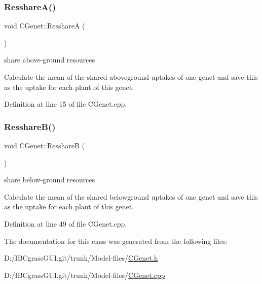 \subsubsection{\texorpdfstring{ResshareA()}{ResshareA()}}
{\footnotesize\ttfamily void C\+Genet\+::\+ResshareA (\begin{DoxyParamCaption}{ }\end{DoxyParamCaption})}



share above-\/ground resources 

Calculate the mean of the shared aboveground uptakes of one genet and save this as the uptake for each plant of this genet. 

Definition at line 15 of file C\+Genet.\+cpp.

\mbox{\label{class_c_genet_a2bc46111b9623273b6cfbf1944d063c1}} 
\subsubsection{\texorpdfstring{ResshareB()}{ResshareB()}}
{\footnotesize\ttfamily void C\+Genet\+::\+ResshareB (\begin{DoxyParamCaption}{ }\end{DoxyParamCaption})}



share below-\/ground resources 

Calculate the mean of the shared belowground uptakes of one genet and save this as the uptake for each plant of this genet. 

Definition at line 49 of file C\+Genet.\+cpp.



The documentation for this class was generated from the following files\+:\begin{DoxyCompactItemize}
\item 
D\+:/\+I\+B\+Cgrass\+G\+U\+I.\+git/trunk/\+Model-\/files/\mbox{\hyperlink{_c_genet_8h}{C\+Genet.\+h}}\item 
D\+:/\+I\+B\+Cgrass\+G\+U\+I.\+git/trunk/\+Model-\/files/\mbox{\hyperlink{_c_genet_8cpp}{C\+Genet.\+cpp}}\end{DoxyCompactItemize}
